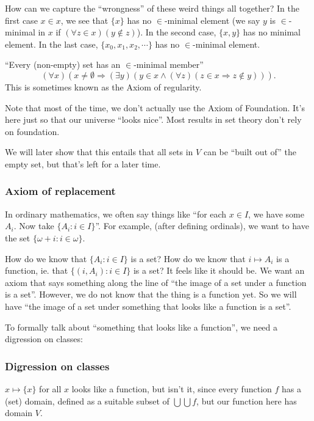 \documentclass[a4paper]{article}
\begin{document}
How can we capture the ``wrongness'' of these weird things all together? In the first case $x\in x$, we see that $\{x\}$ has no $\in$-minimal element (we say $y$ is $\in$-minimal in $x$ if $(\forall z\in x)(y\not\in z)$). In the second case, $\{x, y\}$ has no minimal element. In the last case, $\{x_0, x_1, x_2, \cdots\}$ has no $\in$-minimal element.


\begin{axiom}
  ``Every (non-empty) set has an $\in$-minimal member''
  \[
    (\forall x)(x\not= \emptyset \Rightarrow (\exists y)(y\in x\wedge (\forall z)(z\in x \Rightarrow z\not\in y))).
  \]
  This is sometimes known as the Axiom of regularity.
\end{axiom}
Note that most of the time, we don't actually use the Axiom of Foundation. It's here just so that our universe ``looks nice''. Most results in set theory don't rely on foundation.

We will later show that this entails that all sets in $V$ can be ``built out of'' the empty set, but that's left for a later time.

\subsubsection*{Axiom of replacement}
In ordinary mathematics, we often say things like ``for each $x\in I$, we have some $A_i$. Now take $\{A_i: i\in I\}$''. For example, (after defining ordinals), we want to have the set $\{\omega + i: i\in \omega\}$.

How do we know that $\{A_i: i\in I\}$ is a set? How do we know that $i\mapsto A_i$ is a function, ie. that $\{(i, A_i): i\in I\}$ is a set? It feels like it should be. We want an axiom that says something along the line of ``the image of a set under a function is a set''. However, we do not know that the thing is a function yet. So we will have ``the image of a set under something that looks like a function is a set''.

To formally talk about ``something that looks like a function'', we need a digression on classes:

\subsubsection*{Digression on classes}
$x\mapsto \{x\}$ for all $x$ looks like a function, but isn't it, since every function $f$ has a (set) domain, defined as a suitable subset of $\bigcup \bigcup f$, but our function here has domain $V$.
\end{document}
